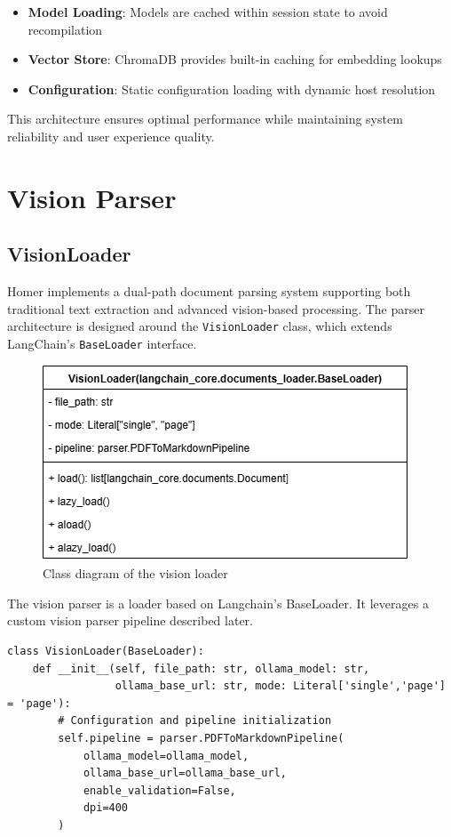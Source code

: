 \documentclass[11pt,a4paper]{report}
\begin{document}
\begin{itemize}
    \item \textbf{Model Loading}: Models are cached within session state to avoid recompilation
    \item \textbf{Vector Store}: ChromaDB provides built-in caching for embedding lookups
    \item \textbf{Configuration}: Static configuration loading with dynamic host resolution
\end{itemize}

This architecture ensures optimal performance while maintaining system reliability and user experience quality.




\chapter{Vision Parser}

\section{VisionLoader}

Homer implements a dual-path document parsing system supporting both traditional text extraction and advanced vision-based processing. The parser architecture is designed around the \texttt{VisionLoader} class, which extends LangChain's \texttt{BaseLoader} interface.

\begin{figure}[H]
    \centering
    \includegraphics[width=0.55\linewidth]{static/schemas/classDiagramVisionLoader.drawio.png}
    \caption{Class diagram of the vision loader}
    \label{fig:VisionLoader}
\end{figure}

The vision parser is a loader based on Langchain's BaseLoader. It leverages a custom vision parser pipeline described later.\\

\begin{minipage}{\linewidth}
\begin{lstlisting}[caption={VisionLoader class structure}]
class VisionLoader(BaseLoader):
    def __init__(self, file_path: str, ollama_model: str, 
                 ollama_base_url: str, mode: Literal['single','page'] = 'page'):
        # Configuration and pipeline initialization
        self.pipeline = parser.PDFToMarkdownPipeline(
            ollama_model=ollama_model,
            ollama_base_url=ollama_base_url,
            enable_validation=False,
            dpi=400
        )
\end{lstlisting}
\end{minipage}
\end{document}
